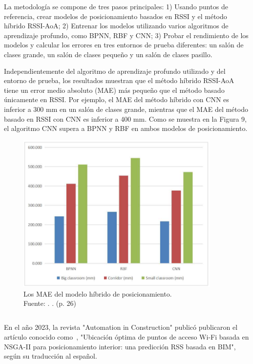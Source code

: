 La metodología se compone de tres pasos principales: 1) Usando puntos de referencia, crear modelos de posicionamiento basados en RSSI y el método híbrido RSSI-AoA; 2) Entrenar los modelos utilizando varios algoritmos de aprendizaje profundo, como BPNN, RBF y CNN; 3) Probar el rendimiento de los modelos y calcular los errores en tres entornos de prueba diferentes: un salón de clases grande, un salón de clases pequeño y un salón de clases pasillo.

Independientemente del algoritmo de aprendizaje profundo utilizado y del entorno de prueba, los resultados muestran que el método híbrido RSSI-AoA tiene un error medio absoluto (MAE) más pequeño que el método basado únicamente en RSSI. Por ejemplo, el MAE del método híbrido con CNN es inferior a 300 mm en un salón de clases grande, mientras que el MAE del método basado en RSSI con CNN es inferior a 400 mm. Como se muestra en la Figura 9, el algoritmo CNN supera a BPNN y RBF en ambos modelos de posicionamiento.

\begin{figure}[!ht]
	\begin{center}
		\includegraphics[width=0.90\textwidth]{2/figures/cai2023.png}
		\caption[Los MAE del modelo híbrido de posicionamiento]{Los MAE del modelo híbrido de posicionamiento.\\
			Fuente: \cite{pr_cai2023precisewifi}. . (p. 26)}
		\label{2:fig117}
	\end{center}
\end{figure}

\subsection{}
En el año 2023, la revista "Automation in Construction" publicó \cite{pr_hosseini2023NSGAIIap} publicaron el artículo conocido como , "Ubicación óptima de puntos de acceso Wi-Fi basada en NSGA-II para posicionamiento interior: una predicción RSS basada en BIM", según su traducción al español.

